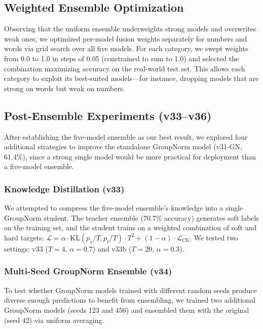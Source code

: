 \documentclass[conference]{IEEEtran}
\begin{document}
\subsection{Weighted Ensemble Optimization}
\label{sec:weighted_ensemble_methods}

Observing that the uniform ensemble underweights strong models and overwrites weak ones, we optimized per-model fusion weights separately for numbers and words via grid search over all five models. For each category, we swept weights from 0.0 to 1.0 in steps of 0.05 (constrained to sum to 1.0) and selected the combination maximizing accuracy on the real-world test set. This allows each category to exploit its best-suited models---for instance, dropping models that are strong on words but weak on numbers.

\subsection{Post-Ensemble Experiments (v33--v36)}
\label{sec:post_ensemble_methods}

After establishing the five-model ensemble as our best result, we explored four additional strategies to improve the standalone GroupNorm model (v31-GN, 61.4\%), since a strong single model would be more practical for deployment than a five-model ensemble.

\subsubsection{Knowledge Distillation (v33)}
We attempted to compress the five-model ensemble's knowledge into a single GroupNorm student. The teacher ensemble (70.7\% accuracy) generates soft labels on the training set, and the student trains on a weighted combination of soft and hard targets: $\mathcal{L} = \alpha \cdot \text{KL}(p_s / T, p_t / T) \cdot T^2 + (1-\alpha) \cdot \mathcal{L}_{\text{CE}}$. We tested two settings: v33 ($T=4$, $\alpha=0.7$) and v33b ($T=20$, $\alpha=0.3$).

\subsubsection{Multi-Seed GroupNorm Ensemble (v34)}
To test whether GroupNorm models trained with different random seeds produce diverse enough predictions to benefit from ensembling, we trained two additional GroupNorm models (seeds 123 and 456) and ensembled them with the original (seed 42) via uniform averaging.
\end{document}
